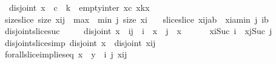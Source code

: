 \begin{isabellebody}
\ \ \ \ {\isachardoublequoteopen}disjoint\ x\ {\isasymLongrightarrow}\ c\ {\isasymle}\ k\ {\isasymLongrightarrow}\ empty{\isacharunderscore}inter\ {\isacharparenleft}x{\isasymdagger}{}{\isachardot}{\isachardot}c{\isacharparenright}\ {\isacharparenleft}x{\isasymdagger}k{\isachardot}{\isachardot}{\isacharparenleft}{\isacharhash}x{\isacharparenright}{\isacharparenright}{\isachardoublequoteclose}\isanewline
\ \ \ size{\isacharunderscore}slice{\isacharcolon}\ {\isachardoublequoteopen}size\ {\isacharparenleft}x{\isasymdagger}i{\isachardot}{\isachardot}j{\isacharparenright}\ {\isacharequal}\ max\ {}\ {\isacharparenleft}{\isacharparenleft}min\ j\ {\isacharparenleft}size\ x{\isacharparenright}{\isacharparenright}{\isacharminus}i{\isacharparenright}{\isachardoublequoteclose}\isanewline
\ \ \ slice{\isacharunderscore}slice{\isacharcolon}\ {\isachardoublequoteopen}{\isacharparenleft}x{\isasymdagger}i{\isachardot}{\isachardot}j{\isacharparenright}{\isasymdagger}a{\isachardot}{\isachardot}b\ {\isacharequal}\ x{\isasymdagger}{\isacharparenleft}i{\isacharplus}a{\isacharparenright}{\isachardot}{\isachardot}{\isacharparenleft}min\ j\ {\isacharparenleft}i{\isacharplus}b{\isacharparenright}{\isacharparenright}{\isachardoublequoteclose}\isanewline
\ \ \ disjoint{\isacharunderscore}slice{\isacharunderscore}suc{\isacharcolon}\ \isanewline
\ \ \ \ {\isachardoublequoteopen}disjoint\ x\ {\isasymLongrightarrow}\ i{\isasymnoteq}j\ {\isasymLongrightarrow}\ i\ {\isacharless}\ {\isacharparenleft}{\isacharhash}x{\isacharparenright}\ {\isasymLongrightarrow}\ j\ {\isacharless}\ {\isacharparenleft}{\isacharhash}x{\isacharparenright}\ {\isasymLongrightarrow}\ \isanewline
\ \ \ \ x{\isasymdagger}i{\isachardot}{\isachardot}{\isacharparenleft}Suc\ i{\isacharparenright}\ {\isasymnoteq}\ x{\isasymdagger}j{\isachardot}{\isachardot}{\isacharparenleft}Suc\ j{\isacharparenright}{\isachardoublequoteclose}\isanewline
\ \ \ disjoint{\isacharunderscore}slice{\isacharbrackleft}simp{\isacharbrackright}{\isacharcolon}\ {\isachardoublequoteopen}disjoint\ x\ {\isasymLongrightarrow}\ disjoint\ {\isacharparenleft}x{\isasymdagger}i{\isachardot}{\isachardot}j{\isacharparenright}{\isachardoublequoteclose}\isanewline
\ \ \ forall{\isacharunderscore}slice{\isacharunderscore}implies{\isacharunderscore}eq{\isacharcolon}\ {\isachardoublequoteopen}{\isacharparenleft}{\isacharhash}x{\isacharparenright}\ {\isacharequal}\ {\isacharparenleft}{\isacharhash}y{\isacharparenright}\ {\isasymand}\ {\isacharparenleft}{\isasymforall}i\ j{\isachardot}\ {\isacharparenleft}x{\isasymdagger}i{\isachardot}{\isachardot}j{\isacharparenright}\ {\isacharequal}\ \isanewline

\end{isabellebody}
